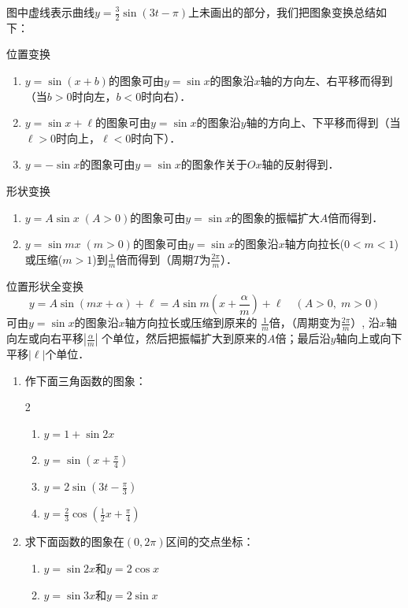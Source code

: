 图中虚线表示曲线$y=\frac{3}{2}\sin(3t-\pi)$上未画出的部分，我们把图象变换总结如下：

\begin{blk}{位置变换}
\begin{enumerate}
    \item $y=\sin(x+b)$的图象可由$y=\sin x$的图象沿$x$轴的方向左、右平移而得到（当$b>0$时向左，$b<0$时向右）．
    \item $y=\sin x+\ell$的图象可由$y=\sin x$的图象沿$y$轴的方向上、下平移而得到（当$\ell>0$时向上，$\ell<0$时向下）．
    \item $y=-\sin x$的图象可由$y=\sin x$的图象作关于$Ox$轴的反射得到．
\end{enumerate}
\end{blk}

\begin{blk}{形状变换}
    \begin{enumerate}
        \item $y=A\sin x\; (A>0)$的图象可由$y=\sin x$的图象的振幅扩大$A$倍而得到．
\item $y=\sin mx\; (m>0)$的图象可由$y=\sin x$的图象沿$x$轴方向拉长($0<m<1$)或压缩($m>1$)到$\frac{1}{m}$倍而得到（周期$T$为$\frac{2\pi}{m}$）．
    \end{enumerate}
\end{blk}


\begin{blk}{位置形状全变换}
\[y=A\sin(mx+\alpha)+\ell=A\sin m\left(x+\frac{\alpha}{m}\right) +\ell\quad  (A> 0,\; m>0)\]
可由$y=\sin x$的图象沿$x$轴方向拉长或压缩到原来的
$\frac{1}{m}$倍，（周期变为$\frac{2\pi}{m}$）, 沿$x$轴向左或向右平移$\left|\frac{\alpha}{m}\right|$
个单位，然后把振幅扩大到原来的$A$倍；最后沿$y$轴向上或向下平移$|\ell|$个单位．
\end{blk}

\begin{ex}
\begin{enumerate}
    \item 作下面三角函数的图象：
    \begin{multicols}{2}
\begin{enumerate}
    \item $y=1+\sin2x$
    \item $y=\sin\left(x+\frac{\pi}{4}\right) $
    \item $y=2\sin\left(3t-\frac{\pi}{3}\right)$
    \item $y=\frac{2}{3}\cos\left(\frac{1}{2}x+\frac{\pi}{4}\right)$
\end{enumerate}
    \end{multicols}
    \item 求下面函数的图象在$(0, 2\pi)$区间的交点坐标：
    \begin{enumerate}
        \item $y=\sin 2x$和$y=2\cos x$
        \item $y=\sin 3x$和$y=2\sin x$
    \end{enumerate}
\end{enumerate}
\end{ex}

